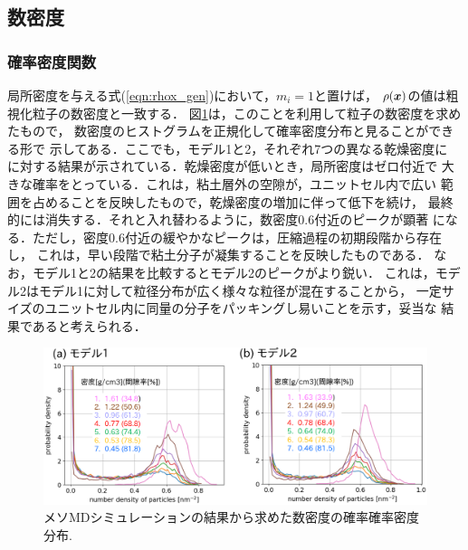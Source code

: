 \subsection{数密度}
\subsubsection{確率密度関数}
局所密度を与える式(\ref{eqn:rhox_gen})において，$m_i=1$と置けば，
$\rho(\mbox{\boldmath $x$})$の値は粗視化粒子の数密度と一致する．
図\ref{fig:fig8}は，このことを利用して粒子の数密度を求めたもので，
数密度のヒストグラムを正規化して確率密度分布と見ることができる形で
示してある．ここでも，モデル1と2，それぞれ7つの異なる乾燥密度に
に対する結果が示されている．乾燥密度が低いとき，局所密度はゼロ付近で
大きな確率をとっている．これは，粘土層外の空隙が，ユニットセル内で広い
範囲を占めることを反映したもので，乾燥密度の増加に伴って低下を続け，
最終的には消失する．それと入れ替わるように，数密度0.6付近のピークが顕著
になる．ただし，密度0.6付近の緩やかなピークは，圧縮過程の初期段階から存在し，
これは，早い段階で粘土分子が凝集することを反映したものである．
なお，モデル1と2の結果を比較するとモデル2のピークがより鋭い．
これは，モデル2はモデル1に対して粒径分布が広く様々な粒径が混在することから，
一定サイズのユニットセル内に同量の分子をパッキングし易いことを示す，妥当な
結果であると考えられる．
\begin{figure}[h]
	\begin{center}
	\includegraphics[width=1.0\linewidth]{Figs/fig8.eps} 
	\end{center}
	\caption{
		メソMDシミュレーションの結果から求めた数密度の確率確率密度分布.
	} 
	\label{fig:fig8}
\end{figure}
